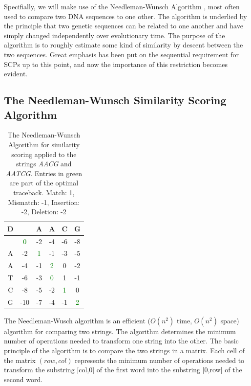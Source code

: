 \documentclass{article}
\begin{document}
Specifially, we will make use of the Needleman-Wunsch Algorithm \citep{needleman1970general}, most often used to compare two DNA sequences to one other. The algorithm is underlied by the principle that two genetic sequences can be related to one another and have simply changed independently over evolutionary time. The purpose of the algorithm is to roughly estimate some kind of similarity by descent between the two sequences. Great emphasis has been put on the sequential requirement for SCPs up to this point, and now the importance of this restriction becomes evident.



 \subsection{The Needleman-Wunsch Similarity Scoring Algorithm}
\begin{table}
\begin{center}

\begin{tabular}{ c | c c c c c}
 D&&A&A&C&G\\ \hline
 & \textcolor{green}{0} & -2 & -4 & -6 &  -8 \\
 A & -2 & \textcolor{green}{1} & -1 & -3 & -5  \\
 A & -4 & -1 & \textcolor{green}{2} & 0 &  -2 \\
 T & -6 & -3 & \textcolor{green}{0} & 1 & -1 \\
 C & -8 & -5 & -2 & \textcolor{green}{1} & 0 \\
 G & -10 & -7 & -4 & -1 & \textcolor{green}{2} 
\end{tabular}
\caption{The Needleman-Wunsch Algorithm for similarity scoring applied to the strings \textit{AACG} and \textit{AATCG}. Entries in green are part of the optimal traceback. Match: 1, Mismatch: -1, Insertion: -2, Deletion: -2}
\label{tbl:need1}

\end{center}
\end{table}

The Needleman-Wusch algorithm is an efficient ($O(n^2)$ time, $O(n^2)$ space) algorithm for comparing two strings. The algorithm determines the minimum number of operations needed to transform one string into the other. The basic principle of the algorithm is to compare the two strings in a matrix. Each cell of the matrix $(row,col)$ represents the minimum number of operations needed to transform the substring [col,0] of the first word into the substring [0,row] of the second word. 
\end{document}
